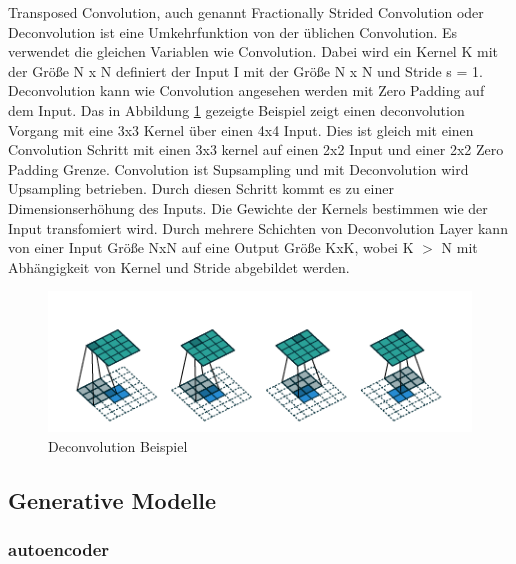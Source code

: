 \documentclass{llncs}
\begin{document}
Transposed Convolution, auch genannt Fractionally Strided Convolution oder Deconvolution ist eine Umkehrfunktion von der üblichen Convolution. Es verwendet die gleichen Variablen wie Convolution. Dabei wird ein Kernel K mit der Größe N x N definiert der Input I mit der Größe N x N und Stride s = 1. Deconvolution kann wie Convolution angesehen werden mit  Zero Padding auf dem Input.  Das in Abbildung \ref{fig:Bild4} gezeigte Beispiel zeigt einen deconvolution Vorgang mit eine 3x3 Kernel über einen 4x4 Input. Dies ist gleich mit einen Convolution Schritt mit einen 3x3 kernel auf einen 2x2 Input und einer 2x2 Zero Padding Grenze. Convolution ist Supsampling und mit Deconvolution wird Upsampling betrieben. Durch diesen Schritt kommt es zu einer Dimensionserhöhung des Inputs. Die Gewichte der Kernels bestimmen wie der Input transfomiert wird. Durch mehrere Schichten von Deconvolution Layer kann von einer Input Größe NxN auf eine Output Größe KxK, wobei K $>$ N mit Abhängigkeit von Kernel und Stride abgebildet werden\cite{conv}. 

\begin{figure}[htbp] 
	\centering
	\includegraphics[width=1.0\textwidth]{decon.png}
	\caption{Deconvolution Beispiel}
	\label{fig:Bild4}
\end{figure}
\newpage

\subsection{Generative Modelle}


\subsubsection{autoencoder}
\end{document}
